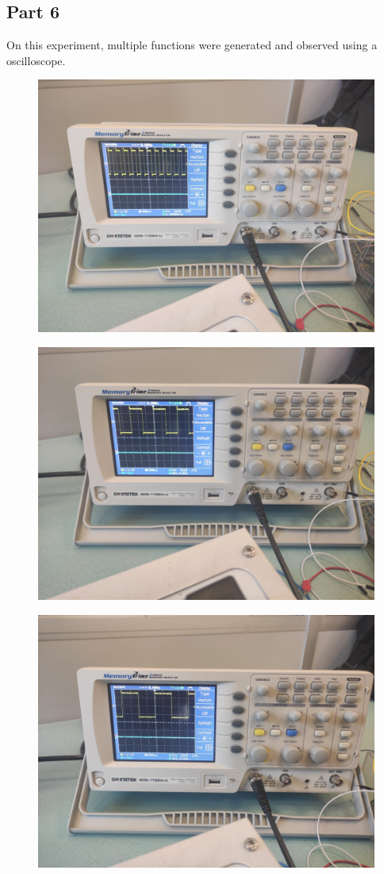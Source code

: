 \documentclass[pdftex,12pt,a4paper]{article}
\begin{document}
\subsection{Part 6}
On this experiment, multiple functions were generated and observed using a oscilloscope.
    \begin{figure}[H]
	\centering
	\includegraphics[width=.7\textwidth]{ex6-1.png}
	\caption{}
	\label{fig8}
\end{figure}

\begin{figure}[H]
	\centering
	\includegraphics[width=.7\textwidth]{ex6-2.png}
	\caption{}
	\label{fig9}
\end{figure}

\begin{figure}[H]
	\centering
	\includegraphics[width=.7\textwidth]{ex6-3.png}
	\caption{}
	\label{fig10}
\end{figure}
\end{document}
